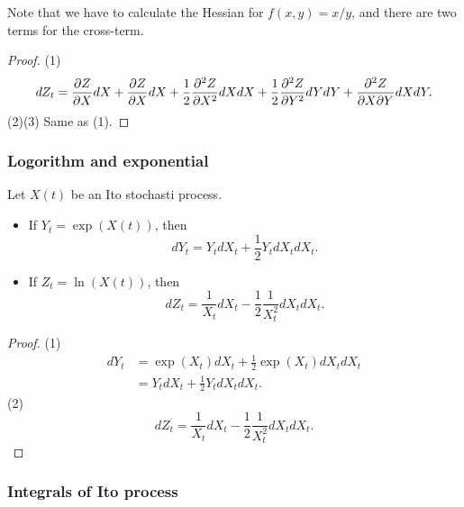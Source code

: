 \begin{refsection}
\begin{lemma}
\begin{itemize}
		Note that we have to calculate the Hessian for $f(x,y)=x/y$, and there are two terms for the cross-term.
	\end{itemize}
\end{lemma}
\begin{proof}
	(1)$$dZ_t = \frac{\partial Z}{\partial X}dX + \frac{\partial Z}{\partial X}dX +\frac{1}{2}\frac{\partial^2 Z}{\partial X^2}dXdX + \frac{1}{2}\frac{\partial^2 Z}{\partial Y^2}dYdY + \frac{\partial^2 Z}{\partial X \partial Y}dXdY.$$
	(2)(3) Same as (1).
\end{proof}

\subsubsection{Logorithm and exponential}
\begin{lemma}\label{ch:theory-of-stochastic-process:th:ItoLemmaLogorithmAndExponential}
	Let $X(t)$ be an Ito stochasti process. 
	\begin{itemize}
		\item If $Y_t = \exp(X(t))$, then
		$$dY_t = Y_tdX_t + \frac{1}{2}Y_tdX_tdX_t.$$
		\item If $Z_t = \ln(X(t))$, then
		$$dZ_t = \frac{1}{X_t}dX_t - \frac{1}{2}\frac{1}{X_t^2}dX_tdX_t.$$
	\end{itemize}
\end{lemma}
\begin{proof}
	(1)
	\begin{align*}
	dY_t &= \exp(X_t)dX_t + \frac{1}{2}\exp(X_t)dX_tdX_t \\
	&= Y_tdX_t + \frac{1}{2}Y_tdX_tdX_t.
	\end{align*}
	(2)
	$$dZ_t = \frac{1}{X_t}dX_t - \frac{1}{2}\frac{1}{X_t^2}dX_tdX_t.$$
	
\end{proof}



\subsubsection{Integrals of Ito process}


\end{refsection}
